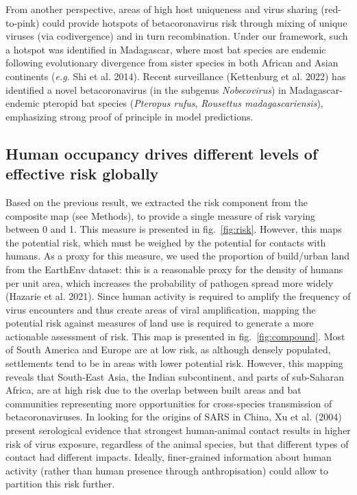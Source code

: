 \documentclass[11pt]{article}
\begin{document}
From another perspective, areas of high host uniqueness and virus
sharing (red-to-pink) could provide hotspots of betacoronavirus risk
through mixing of unique viruses (via codivergence) and in turn
recombination. Under our framework, such a hotspot was identified in
Madagascar, where most bat species are endemic following evolutionary
divergence from sister species in both African and Asian continents
(\emph{e.g.} Shi et al. 2014). Recent surveillance (Kettenburg et al.
2022) has identified a novel betacoronavirus (in the subgenus
\emph{Nobecovirus}) in Madagascar-endemic pteropid bat species
(\emph{Pteropus rufus}, \emph{Rousettus madagascariensis}), emphasizing
strong proof of principle in model predictions.

\hypertarget{human-occupancy-drives-different-levels-of-effective-risk-globally}{%
\subsection{Human occupancy drives different levels of effective risk
globally}\label{human-occupancy-drives-different-levels-of-effective-risk-globally}}

Based on the previous result, we extracted the risk component from the
composite map (see Methods), to provide a single measure of risk varying
between 0 and 1. This measure is presented in fig.~\ref{fig:risk}.
However, this maps the potential risk, which must be weighed by the
potential for contacts with humans. As a proxy for this measure, we used
the proportion of build/urban land from the EarthEnv dataset: this is a
reasonable proxy for the density of humans per unit area, which
increases the probability of pathogen spread more widely (Hazarie et al.
2021). Since human activity is required to amplify the frequency of
virus encounters and thus create areas of viral amplification, mapping
the potential risk against measures of land use is required to generate
a more actionable assessment of risk. This map is presented in
fig.~\ref{fig:compound}. Most of South America and Europe are at low
risk, as although densely populated, settlements tend to be in areas
with lower potential risk. However, this mapping reveals that South-East
Asia, the Indian subcontinent, and parts of sub-Saharan Africa, are at
high risk due to the overlap between built areas and bat communities
representing more opportunities for cross-species transmission of
betacoronaviruses. In looking for the origins of SARS in China, Xu et
al. (2004) present serological evidence that strongest human-animal
contact results in higher risk of virus exposure, regardless of the
animal species, but that different types of contact had different
impacts. Ideally, finer-grained information about human activity (rather
than human presence through anthropisation) could allow to partition
this risk further.
\end{document}
